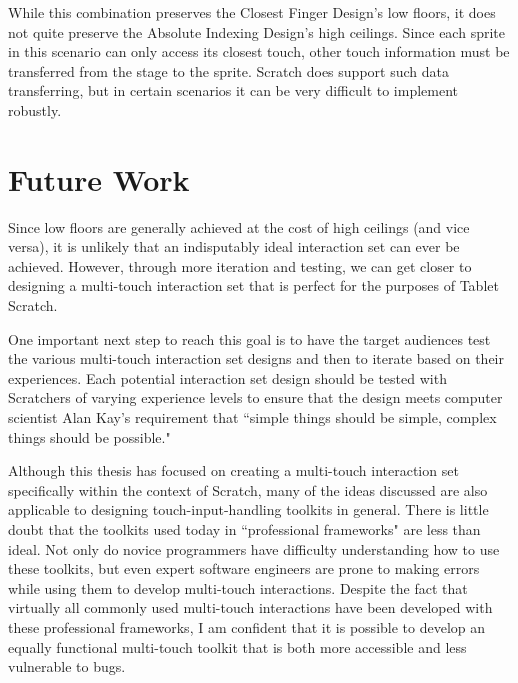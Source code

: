 While this combination preserves the Closest Finger Design's low floors, it does not quite preserve the Absolute Indexing Design's high ceilings. Since each sprite in this scenario can only access its closest touch, other touch information must be transferred from the stage to the sprite. Scratch does support such data transferring, but in certain scenarios it can be very difficult to implement robustly.

\section{Future Work}

Since low floors are generally achieved at the cost of high ceilings (and vice versa), it is unlikely that an indisputably ideal interaction set can ever be achieved. However, through more iteration and testing, we can get closer to designing a multi-touch interaction set that is perfect for the purposes of Tablet Scratch.

One important next step to reach this goal is to have the target audiences test the various multi-touch interaction set designs and then to iterate based on their experiences. Each potential interaction set design should be tested with Scratchers of varying experience levels to ensure that the design meets computer scientist Alan Kay's requirement that ``simple things should be simple, complex things should be possible."

Although this thesis has focused on creating a multi-touch interaction set specifically within the context of Scratch, many of the ideas discussed are also applicable to designing touch-input-handling toolkits in general. There is little doubt that the toolkits used today in ``professional frameworks" are less than ideal. Not only do novice programmers have difficulty understanding how to use these toolkits, but even expert software engineers are prone to making errors while using them to develop multi-touch interactions. Despite the fact that virtually all commonly used multi-touch interactions have been developed with these professional frameworks, I am confident that it is possible to develop an equally functional multi-touch toolkit that is both more accessible and less vulnerable to bugs.

